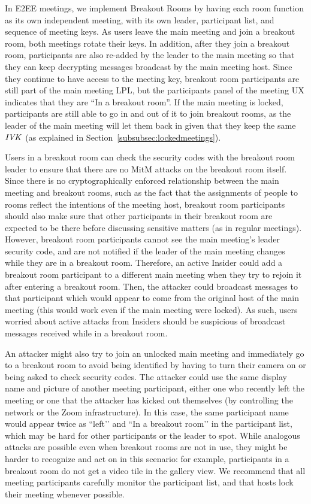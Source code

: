 In E2EE meetings, we implement Breakout Rooms by having each room function as its own independent
meeting, with its own leader, participant list, and sequence of meeting keys. As users leave the
main meeting and join a breakout room, both meetings rotate their keys. In addition, after they join
a breakout room, participants are also re-added by the leader to the main meeting so that they can
keep decrypting messages broadcast by the main meeting host. Since they continue to have access to
the meeting key, breakout room participants are still part of the main meeting LPL, but the
participants panel of the meeting UX indicates that they are ``In a breakout room''. If the main
meeting is locked, participants are still able to go in and out of it to join breakout rooms, as the
leader of the main meeting will let them back in given that they keep the same $\mathit{IVK}$ (as explained
in Section~\ref{subsubsec:lockedmeetings}). 

Users in a breakout room can check the security codes with the breakout room leader to ensure that
there are no MitM attacks on the breakout room itself. Since there is no cryptographically enforced
relationship between the main meeting and breakout rooms, such as the fact that the assignments of
people to rooms reflect the intentions of the meeting host, breakout room participants should also
make sure that other participants in their breakout room are expected to be there before discussing
sensitive matters (as in regular meetings). However, breakout room participants cannot see the main
meeting's leader security code, and are not notified if the leader of the main meeting changes while
they are in a breakout room. Therefore, an active Insider could add a breakout room participant to a
different main meeting when they try to rejoin it after entering a breakout room. Then, the attacker
could broadcast messages to that participant which would appear to come from the original host of
the main meeting (this would work even if the main meeting were locked). As such, users worried
about active attacks from Insiders should be suspicious of broadcast messages received while in a
breakout room. 

An attacker might also try to join an unlocked main meeting and immediately go to a breakout room to
avoid being identified by having to turn their camera on or being asked to check security codes. The
attacker could use the same display name and picture of another meeting participant, either one who
recently left the meeting or one that the attacker has kicked out themselves (by controlling the
network or the Zoom infrastructure). In this case, the same participant name would appear twice as
``left’’ and ``In a breakout room’’ in the participant list, which may be hard for other
participants or the leader to spot. While analogous attacks are possible even when breakout rooms
are not in use, they might be harder to recognize and act on in this scenario: for example,
participants in a breakout room do not get a video tile in the gallery view. We recommend that all
meeting participants carefully monitor the participant list, and that hosts lock their meeting
whenever possible.

